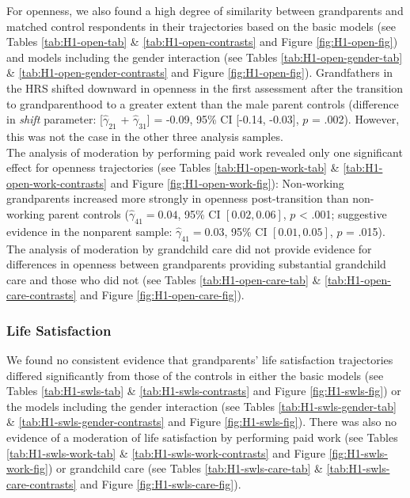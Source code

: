 \documentclass[
  english,
  man, noextraspace,floatsintext]{apa7}
\begin{document}
For openness, we also found a high degree of similarity between grandparents and matched control respondents in their trajectories based on the basic models (see Tables \ref{tab:H1-open-tab} \& \ref{tab:H1-open-contrasts} and Figure \ref{fig:H1-open-fig}) and models including the gender interaction (see Tables \ref{tab:H1-open-gender-tab} \& \ref{tab:H1-open-gender-contrasts} and Figure \ref{fig:H1-open-fig}). Grandfathers in the HRS shifted downward in openness in the first assessment after the transition to grandparenthood to a greater extent than the male parent controls (difference in \emph{shift} parameter: {[}\(\hat{\gamma}_{21}\) + \(\hat{\gamma}_{31}\){]} = -0.09, 95\% CI {[}-0.14, -0.03{]}, \(p\) = .002). However, this was not the case in the other three analysis samples.\\
The analysis of moderation by performing paid work revealed only one significant effect for openness trajectories (see Tables \ref{tab:H1-open-work-tab} \& \ref{tab:H1-open-work-contrasts} and Figure \ref{fig:H1-open-work-fig}): Non-working grandparents increased more strongly in openness post-transition than non-working parent controls (\(\hat{\gamma}_{41} = 0.04\), 95\% CI \([0.02, 0.06]\), \(p\) \textless{} .001; suggestive evidence in the nonparent sample: \(\hat{\gamma}_{41} = 0.03\), 95\% CI \([0.01, 0.05]\), \(p\) = .015). The analysis of moderation by grandchild care did not provide evidence for differences in openness between grandparents providing substantial grandchild care and those who did not (see Tables \ref{tab:H1-open-care-tab} \& \ref{tab:H1-open-care-contrasts} and Figure \ref{fig:H1-open-care-fig}).

\hypertarget{life-satisfaction-1}{%
\subsubsection{Life Satisfaction}\label{life-satisfaction-1}}

We found no consistent evidence that grandparents' life satisfaction trajectories differed significantly from those of the controls in either the basic models (see Tables \ref{tab:H1-swls-tab} \& \ref{tab:H1-swls-contrasts} and Figure \ref{fig:H1-swls-fig}) or the models including the gender interaction (see Tables \ref{tab:H1-swls-gender-tab} \& \ref{tab:H1-swls-gender-contrasts} and Figure \ref{fig:H1-swls-fig}). There was also no evidence of a moderation of life satisfaction by performing paid work (see Tables \ref{tab:H1-swls-work-tab} \& \ref{tab:H1-swls-work-contrasts} and Figure \ref{fig:H1-swls-work-fig}) or grandchild care (see Tables \ref{tab:H1-swls-care-tab} \& \ref{tab:H1-swls-care-contrasts} and Figure \ref{fig:H1-swls-care-fig}).
\end{document}
